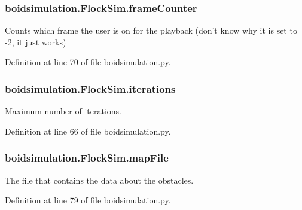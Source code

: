 \hypertarget{classboidsimulation_1_1FlockSim_a7daba8b4e771dcd6f6a7357bda59c56a}{
\subsubsection[{frame\-Counter}]{\setlength{\rightskip}{0pt plus 5cm}boidsimulation.\-Flock\-Sim.\-frame\-Counter}}\label{classboidsimulation_1_1FlockSim_a7daba8b4e771dcd6f6a7357bda59c56a}


Counts which frame the user is on for the playback (don't know why it is set to -\/2, it just works) 



Definition at line 70 of file boidsimulation.\-py.

\hypertarget{classboidsimulation_1_1FlockSim_a1febd4cacbdcffb5b9d096d4716af78f}{
\subsubsection[{iterations}]{\setlength{\rightskip}{0pt plus 5cm}boidsimulation.\-Flock\-Sim.\-iterations}}\label{classboidsimulation_1_1FlockSim_a1febd4cacbdcffb5b9d096d4716af78f}


Maximum number of iterations. 



Definition at line 66 of file boidsimulation.\-py.

\hypertarget{classboidsimulation_1_1FlockSim_a50b375f7caa0e33d87141d2cde14526f}{
\subsubsection[{map\-File}]{\setlength{\rightskip}{0pt plus 5cm}boidsimulation.\-Flock\-Sim.\-map\-File}}\label{classboidsimulation_1_1FlockSim_a50b375f7caa0e33d87141d2cde14526f}


The file that contains the data about the obstacles. 



Definition at line 79 of file boidsimulation.\-py.


